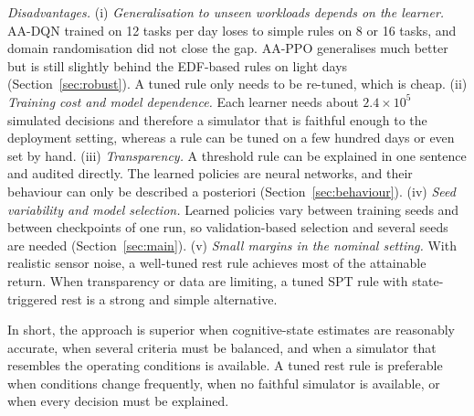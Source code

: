 {\emph{Disadvantages.} (i) \emph{Generalisation to unseen workloads depends on the learner.} AA-DQN trained on 12 tasks per day loses to simple rules on 8 or 16 tasks, and domain randomisation did not close the gap. AA-PPO generalises much better but is still slightly behind the EDF-based rules on light days (Section~\ref{sec:robust}). A tuned rule only needs to be re-tuned, which is cheap. (ii) \emph{Training cost and model dependence.} Each learner needs about $2.4\times10^5$ simulated decisions and therefore a simulator that is faithful enough to the deployment setting, whereas a rule can be tuned on a few hundred days or even set by hand. (iii) \emph{Transparency.} A threshold rule can be explained in one sentence and audited directly. The learned policies are neural networks, and their behaviour can only be described a posteriori (Section~\ref{sec:behaviour}). (iv) \emph{Seed variability and model selection.} Learned policies vary between training seeds and between checkpoints of one run, so validation-based selection and several seeds are needed (Section~\ref{sec:main}). (v) \emph{Small margins in the nominal setting.} With realistic sensor noise, a well-tuned rest rule achieves most of the attainable return. When transparency or data are limiting, a tuned SPT rule with state-triggered rest is a strong and simple alternative.

In short, the approach is superior when cognitive-state estimates are reasonably accurate, when several criteria must be balanced, and when a simulator that resembles the operating conditions is available. A tuned rest rule is preferable when conditions change frequently, when no faithful simulator is available, or when every decision must be explained.

}
